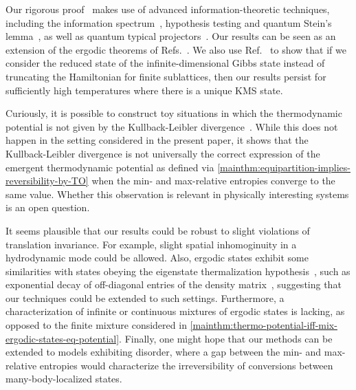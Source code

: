 \documentclass[prl,reprint,longbibliography,superscriptaddress]{revtex4-1}
\newcounter{thm}
\begin{document}
Our rigorous proof~\cite{Sagawa-CMP-inprep} makes use of advanced
information-theoretic techniques, including the information
spectrum~\cite{BookHan_InfSpecMethods,Han2000IEEETIT_hypothesis,Nagaoka2007IEEETIT_hypothesis,Datta2009IEEE_InfSpec,Bowen2006ISIT_beyondiid,Bowen2006arXiv_arbitrary,Schoenmakers2007ISIT_Renyi}, hypothesis testing and quantum Stein's
lemma~\cite{Hiai1991CMP_proper,Ogawa2000IEEETIT_Stein,Tomamichel2013_hierarchy,Dupuis2013_DH}, as well as quantum typical projectors~\cite{BookWilde2013QIT,Bjelakovic2003arXiv_revisted,Bjelakovic2004IM_lattice,Bjelakovic2004CMP_ergodic}.
Our results can be seen as an extension of the ergodic theorems of
Refs.~\cite{Bjelakovic2004CMP_ergodic,Bjelakovic2004IM_lattice}.
We also use Ref.~\cite{Lenci2005JSP_onephase} to show that if we consider the
reduced state of the infinite-dimensional Gibbs state instead of truncating the
Hamiltonian for finite sublattices, then our results persist for sufficiently
high temperatures where there is a unique KMS state.


Curiously, it is possible to construct toy situations in which the thermodynamic
potential is not given by the Kullback-Leibler
divergence~\cite{Sagawa-CMP-inprep}.
While this does not happen in the setting considered in the present paper, it
shows that the Kullback-Leibler divergence is not universally the correct
expression of the emergent thermodynamic potential as defined via
\cref{mainthm:equipartition-implies-reversibility-by-TO} when the min- and
max-relative entropies converge to the same value.  Whether this observation is
relevant in physically interesting systems is an open question.

It seems plausible that our results could be robust to slight violations of
translation invariance.  
For example, slight spatial inhomoginuity in a hydrodynamic mode could be allowed.
Also, ergodic states exhibit some similarities with
states obeying the eigenstate thermalization
hypothesis~\cite{Srednicki1994PRE_ETH,Rigol2008Nat_ETH,DAlessio2016AP_chaos}, such as exponential decay of
off-diagonal entries of the density matrix~\cite{Sagawa-CMP-inprep}, suggesting
that our techniques could be extended to such settings.  Furthermore, a
characterization of infinite or continuous mixtures of ergodic states is
lacking, as opposed to the finite mixture considered in
\cref{mainthm:thermo-potential-iff-mix-ergodic-states-eq-potential}.  Finally,
one might hope that our methods can be extended to models exhibiting disorder,
where a gap between the min- and max-relative entropies would characterize the
irreversibility of conversions between many-body-localized states.
\end{document}
